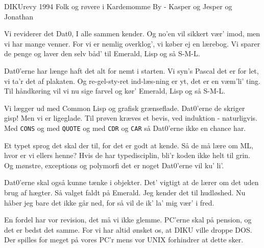 {DIKUrevy 1994}
{Folk og r\o vere i Kardemomme By - Kasper og Jesper og Jonathan}
{
Vi reviderer det Dat0,
I alle sammen kender.
Og no'en vil sikkert vær' imod,
men vi har mange venner.
For vi er nemlig overklog',
vi køber ej en lærebog.
Vi sparer de penge og laver den selv
båd' til Emerald, Lisp og så S-M-L.


Dat0'erne har længe haft
det alt for nemt i starten.
Vi syn's Pascal det er for let,        
vi ta'r det af plakaten.               
Og re-gel-sty-ret ind-læs-ning           
er yt, det er en væm'li' ting.         
Til håndkøring vil vi nu sige farvel    
og kør' Emerald, Lisp og så S-M-L.     

                                                       
Vi lægger ud med Common Lisp             
og grafisk grænseflade.                
Dat0'erne de skriger gisp!             
Men vi er ligeglade.                   
Til prøven kræves et bevis,            
ved induktion - naturligvis.          
Med \texttt{CONS} og med \texttt{QUOTE} og med \texttt{CDR} og \texttt{CAR}
så Dat0'erne ikke en chance har.       



Et typet sprog det skal der til,         
for det er godt at kende.              
Så de må lære om ML,                   
hvor er vi ellers henne?               
Hvis de har typedisciplin,             
bli'r koden ikke helt til grin.        
Og mønstre, exceptions og polymorfi    
det er noget Dat0'erne vil ku' li'.        

                                                       
Dat0'erne skal også kunne                
tænke i objekter.                      
Det' vigtigt at de lærer om det        
uden brug af hægter.                   
Så valget faldt på Emerald.            
Jeg kender det til hudløshed.          
Nu håber jeg bare det ikke går ned,    
for så vil de ik' la' mig vær' i fred.



En fordel har vor revision,             
det må vi ikke glemme.                 
PC'erne skal på pension,               
og det er bedst det samme.             
For vi har altid ønsket os,            
at DIKU ville droppe DOS.              
Der spilles for meget på vores PC'r    
mens vor UNIX forhindrer at dette sker.

}

